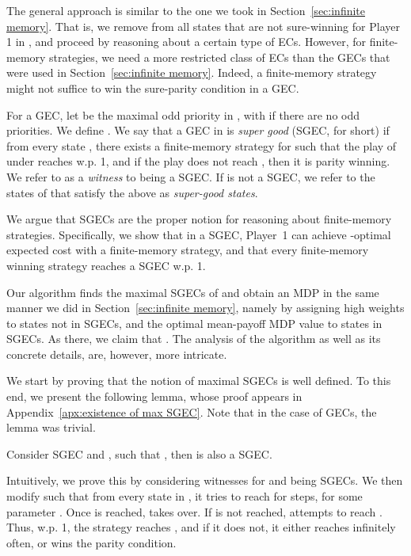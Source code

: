 \documentclass[runningheads,a4paper]{llncs}
\newcommand{\gec}{{GEC}\xspace}
\newcommand{\sgec}{{SGEC}\xspace}
\newcommand{\gecs}{{GECs}\xspace}
\newcommand{\sgecs}{{SGECs}\xspace}
\begin{document}
\vspace*{-5pt}
The general approach is similar to the one we took in Section~\ref{sec:infinite memory}. That is, we remove from  all states that are not sure-winning for Player 1 in , and proceed by reasoning about a certain type of ECs. However, for finite-memory strategies, we need a more restricted class of ECs than the \gecs that were used in Section~\ref{sec:infinite memory}. Indeed, a finite-memory strategy might not suffice to win the sure-parity condition in a \gec.

For a \gec , let  be the maximal odd priority in , with  if there are no odd priorities. We define .
 We say that a \gec  in  is {\em super good} (\sgec, for short) if from every state , there exists a finite-memory strategy  for  such that the play of  under  reaches  w.p. 1, and 
if the play does not reach , then it is parity winning.
We refer to  as a {\em witness} to  being a \sgec. If  is not a \sgec, we refer to the states of  that satisfy the above as {\em super-good states}.

We argue that \sgecs are the proper notion for reasoning about finite-memory strategies. Specifically, we show that in a \sgec, Player~1 can achieve -optimal expected cost with a finite-memory strategy, and that every finite-memory winning strategy reaches a \sgec w.p. 1.

Our algorithm finds the maximal \sgecs of  and obtain an MDP  in the same manner we did in Section~\ref{sec:infinite memory}, namely by assigning high weights to states not in \sgecs, and the optimal mean-payoff MDP value to states in \sgecs. As there, we claim that . The analysis of the algorithm as well as its concrete details, are, however, more intricate. 

We start by proving that the notion of maximal \sgecs is well defined. 
To this end, we present the following lemma, whose proof appears in Appendix~\ref{apx:existence of max SGEC}. Note that in the case of \gecs, the lemma was trivial.
\vspace*{-5pt}
\begin{lemma}
\label{lem:existence of max SGEC}
Consider \sgec  and , such that , then  is also a \sgec.
\end{lemma}
\vspace*{-5pt}
Intuitively, we prove this by considering witnesses  for  and  being \sgecs. We then modify  such that from every state in , it tries to reach  for  steps, for some parameter . Once  is reached,  takes over. If  is not reached,  attempts to reach . Thus, w.p. 1, the strategy reaches , and if it does not, it either reaches  infinitely often, or wins the parity condition.
\end{document}
